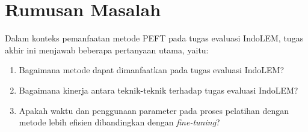 \section{Rumusan Masalah}

Dalam konteks pemanfaatan metode PEFT pada tugas evaluasi IndoLEM, tugas akhir ini menjawab beberapa pertanyaan utama, yaitu:

\begin{enumerate}
    \item Bagaimana metode \PEFT dapat dimanfaatkan pada tugas evaluasi IndoLEM?
    \item Bagaimana kinerja antara teknik-teknik \PEFT terhadap tugas evaluasi IndoLEM?
    \item Apakah waktu dan penggunaan parameter pada proses pelatihan dengan metode \PEFT lebih efisien dibandingkan dengan \textit{fine-tuning}?
\end{enumerate}
